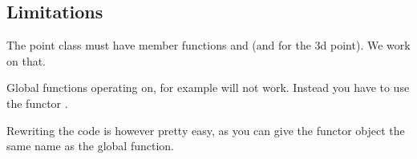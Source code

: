 \ccHtmlLinksOff
{}
\ccHtmlLinksOn


\subsection{Limitations}

The point class must have member functions  and 
(and  for the 3d point). We work on that.

Global functions operating on, for example
 will not work. Instead you have to
use the functor .

Rewriting the code is however pretty easy, as you can give
the functor object the same name as the global function.
